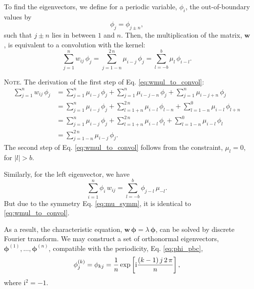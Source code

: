 \documentclass[reprint, superscriptaddress, floatfix]{revtex4-1}
\newcommand{\note}[1]{{\color{DarkGreen}\footnotesize \textsc{Note.} #1}}
\newcommand{\ii}{\mathrm{i}}
\begin{document}
To find the eigenvectors,
we define for a periodic variable, $\phi_i$,
the out-of-boundary values by
%
\begin{equation}
  \phi_j = \phi_{j \pm n},
\label{eq:phi_pbc}
\end{equation}
%
such that $j \pm n$ lies in between $1$ and $n$.
%
Then, the multiplication of the matrix, $\mathbf w$,
is equivalent to a convolution with the kernel:
%
\begin{equation}
  \sum_{ j = 1 }^n
    w_{ij} \, \phi_j
  =
  \sum_{ j = 1 - n }^{ 2 \, n }
    \mu_{i - j} \, \phi_j
  =
  \sum_{ l = -b }^{ b }
    \mu_l \, \phi_{ i - l}
  .
\label{eq:wmul_to_convol}
\end{equation}
%
\note{The derivation of the first step of
  Eq. \eqref{eq:wmul_to_convol}:
$$
\begin{aligned}
  \sum_{j = 1}^n
    w_{ij} \, \phi_j
  &=
  \sum_{j = 1}^n
    \mu_{i - j} \, \phi_j
  +
  \sum_{j = 1}^n
    \mu_{i - j - n} \, \phi_j
  +
  \sum_{j = 1}^n
    \mu_{i - j + n} \, \phi_j
  \\
  &=
  \sum_{j = 1}^n
    \mu_{i - j} \, \phi_j
  +
  \sum_{l = 1+n}^{2 \, n}
    \mu_{i - l} \, \phi_{l - n}
  +
  \sum_{l = 1-n}^0
    \mu_{i - l} \, \phi_{l + n}
  \\
  &=
  \sum_{j = 1}^n
    \mu_{i - j} \, \phi_j
  +
  \sum_{l = 1+n}^{2 \, n}
    \mu_{i - l} \, \phi_{l}
  +
  \sum_{l = 1-n}^0
    \mu_{i - l} \, \phi_{l}
  \\
  &=
  \sum_{j = 1-n}^{2 \, n}
    \mu_{i - j} \, \phi_j
  .
\end{aligned}
$$
The second step of Eq. \eqref{eq:wmul_to_convol}
follows from the constraint, $\mu_l = 0$, for $|l| > b$.

Similarly,
for the left eigenvector, we have
$$
  \sum_{ i = 1 }^n
    \phi_i \, w_{ij}
  =
  \sum_{ l = -b }^b
    \phi_{j - l} \, \mu_{-l}
  .
$$
But due to the symmetry Eq. \eqref{eq:mu_symm},
it is identical to \eqref{eq:wmul_to_convol}.
}
%
As a result, the characteristic equation,
$\mathbf w \, \pmb\phi = \lambda \, \pmb\phi$,
can be solved by discrete Fourier transform.
%
We may construct a set of orthonormal eigenvectors,
$\pmb\phi^{(1)}, \dots, \pmb\phi^{(n)}$,
compatible with the periodicity, Eq. \eqref{eq:phi_pbc},
%
\begin{equation}
  \phi^{(k)}_j
  =
  \phi_{kj}
  =
  \frac 1 n
  \exp
  \left[
    \ii
    \frac{ (k - 1) \, j \, 2 \, \pi }
         {            n             }
  \right]
  ,
  \notag
\end{equation}
%
where $\ii^2 = -1$.
\end{document}
